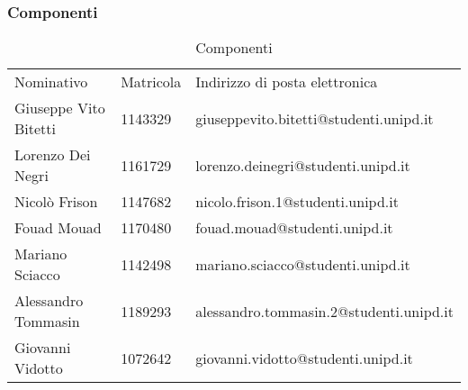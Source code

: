 		\subsubsection{Componenti}
			
			\begin{table}[h!]
				\centering
				\begin{tabular}{lll}
					Nominativo & Matricola & Indirizzo di posta elettronica \\
					Giuseppe Vito Bitetti & 1143329 & giuseppevito.bitetti@studenti.unipd.it \\
					Lorenzo Dei Negri & 1161729 & lorenzo.deinegri@studenti.unipd.it \\
					Nicolò Frison & 1147682 & nicolo.frison.1@studenti.unipd.it \\
					Fouad Mouad & 1170480 & fouad.mouad@studenti.unipd.it \\
					Mariano Sciacco & 1142498 & mariano.sciacco@studenti.unipd.it \\
					Alessandro Tommasin & 1189293 & alessandro.tommasin.2@studenti.unipd.it \\
					Giovanni Vidotto & 1072642 & giovanni.vidotto@studenti.unipd.it \\
				\end{tabular}
				\caption{Componenti}
			\end{table}
		
